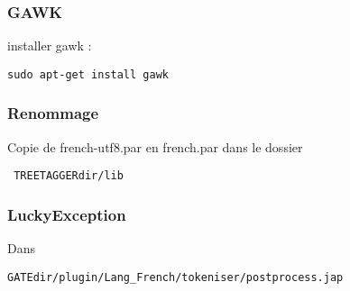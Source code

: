 \documentclass[a4paper, 10pt]{report}
\begin{document}
\subsubsection{GAWK}
installer gawk : \begin{verbatim}sudo apt-get install gawk\end{verbatim}
\subsubsection{Renommage}
Copie de french-utf8.par en french.par dans le dossier \begin{verbatim} TREETAGGERdir/lib\end{verbatim}
\subsubsection{LuckyException}
Dans \begin{verbatim}GATEdir/plugin/Lang_French/tokeniser/postprocess.jap\end{verbatim}
\newpage
\end{document}
